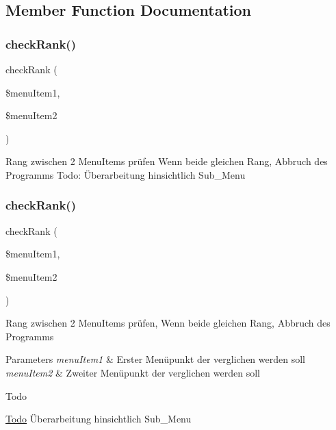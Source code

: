 \subsection{Member Function Documentation}
\mbox{\label{classmenu_item_ad882625e735534b2fee1711a303cab6e}} 
\subsubsection{\texorpdfstring{checkRank()}{checkRank()}\hspace{0.1cm}{\footnotesize\ttfamily [1/2]}}
{\footnotesize\ttfamily check\+Rank (\begin{DoxyParamCaption}\item[{}]{\$menu\+Item1,  }\item[{}]{\$menu\+Item2 }\end{DoxyParamCaption})}

Rang zwischen 2 Menu\+Items prüfen Wenn beide gleichen Rang, Abbruch des Programms Todo\+: Überarbeitung hinsichtlich Sub\+\_\+\+Menu \mbox{\label{classmenu_item_ad882625e735534b2fee1711a303cab6e}} 
\subsubsection{\texorpdfstring{checkRank()}{checkRank()}\hspace{0.1cm}{\footnotesize\ttfamily [2/2]}}
{\footnotesize\ttfamily check\+Rank (\begin{DoxyParamCaption}\item[{}]{\$menu\+Item1,  }\item[{}]{\$menu\+Item2 }\end{DoxyParamCaption})}

Rang zwischen 2 Menu\+Items prüfen, Wenn beide gleichen Rang, Abbruch des Programms


\begin{DoxyParams}{Parameters}
{\em menu\+Item1} & Erster Menüpunkt der verglichen werden soll \\
\hline
{\em menu\+Item2} & Zweiter Menüpunkt der verglichen werden soll \\
\hline
\end{DoxyParams}
\begin{DoxyRefDesc}{Todo}
\item[\mbox{\hyperlink{todo__todo000001}{Todo}}]Überarbeitung hinsichtlich Sub\+\_\+\+Menu \end{DoxyRefDesc}
\mbox{\label{classmenu_item_ad9b18cc3c110ea0dc7bd67a701d12a92}} 
